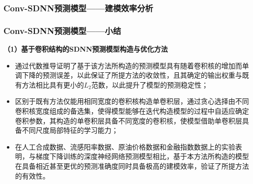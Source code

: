 \begin{frame}
    \frametitle{Conv-SDNN预测模型——建模效率分析}
    

\end{frame}

\begin{frame}
    \frametitle{Conv-SDNN预测模型——小结}

    \textbf{（1）基于卷积结构的SDNN预测模型构造与优化方法}
    \begin{itemize}
        \item 通过代数推导证明了基于该方法所构造的预测模型具有随着卷积核的增加而单调下降的预测误差，以此保证了所提方法的收敛性，且其确定的输出权重与既有方法相比具有更小的$L_2$范数，以此提升了模型的预测稳定性；
        \item 区别于既有方法仅能用相同宽度的卷积核构造单卷积层，通过贪心选择由不同卷积核宽度组成的备选集，使得模型能够在迭代构造模型的过程中自适应确定卷积参数，其构造的单卷积层具备不同宽度的卷积核，使模型借助单卷积层具备不同尺度局部特征的学习能力；
        \item 在人工合成数据、流感阳率数据、原油价格数据和金融指数数据上的实验表明，与梯度下降训练的深度神经网络预测模型相比，基于本方法所构造的模型在具备相近甚至更优的预测准确度同时具备极高的建模效率，验证了所提方法的有效性。
    \end{itemize}

\end{frame}